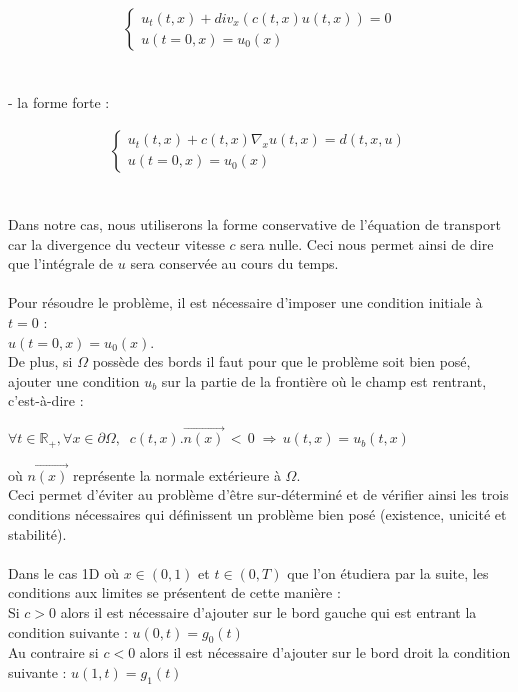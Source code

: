 \documentclass[12pt]{article}
\begin{document}
\begin{eqnarray*}
\left\{ 
    \begin{array}{llll}
        u_t(t,x)+div_x(c(t,x)u(t,x))=0
        \\u(t=0,x)=u_0(x)
       	\end{array}
    \right .
\end{eqnarray*}
\\
\\
- la forme forte : 

\begin{eqnarray*}
\left\{ 
    \begin{array}{llll}
        u_t(t,x)+c(t,x)\nabla_xu(t,x)=d(t,x,u)
        \\u(t=0,x)=u_0(x)
       	\end{array}
    \right .
\end{eqnarray*}
\\
\\
\noindent Dans notre cas, nous utiliserons la forme conservative de l'équation de transport car la divergence du vecteur vitesse $c$ sera nulle. Ceci nous permet ainsi de dire que l'intégrale de $u$ sera conservée au cours du temps. 
\\
\\Pour résoudre le problème, il est nécessaire d'imposer une condition initiale à $t=0$ : \\$u(t=0,x)=u_0(x)$.
\\De plus, si $\Omega$ possède des bords il faut pour que le problème soit bien posé, ajouter  une condition $u_{b}$ sur la partie de la frontière où le champ est rentrant, c'est-à-dire :
\\
\begin{center}
$\forall t\in \mathbb{R}_{+}, \forall x\in \partial\Omega,\;\;c(t,x).\overrightarrow{n(x)}\,<\,0\; \Rightarrow\, u(t,x) = u_b(t,x)$
\end{center}
où $\overrightarrow{n(x)}$ représente la normale extérieure à $\Omega$.
\\Ceci permet d'éviter au problème d'être sur-déterminé et de vérifier ainsi les trois conditions nécessaires qui définissent un problème bien posé (existence, unicité et stabilité).
\\ 
\\Dans le cas 1D où $x\in (0,1)$ et $t\in (0,T)$ que l'on étudiera par la suite, les conditions aux limites se présentent de cette manière :
\\
Si $c>0$ alors il est nécessaire d'ajouter sur le bord gauche qui est entrant la condition suivante : $u(0,t)=g_0(t)$
\\ Au contraire si $c<0$ alors il est nécessaire d'ajouter sur le bord droit la condition suivante : $u(1,t)=g_1(t)$ 
\\
\end{document}
